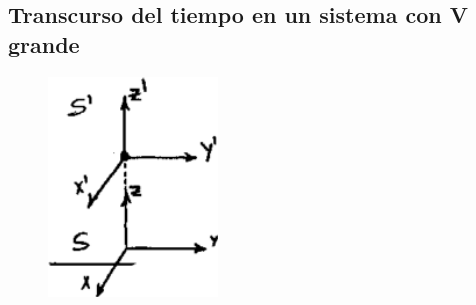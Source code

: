 \documentclass[10pt,oneside]{CBFT_book}
\begin{document}
\subsection{Transcurso del tiempo en un sistema con V grande}

\begin{figure}[htb]
	\begin{center}
	\includegraphics[width=0.4\textwidth]{images/fig_ft1_vgrande.pdf}	 
	\end{center}
	\caption{}
\end{figure} 




\end{document}
